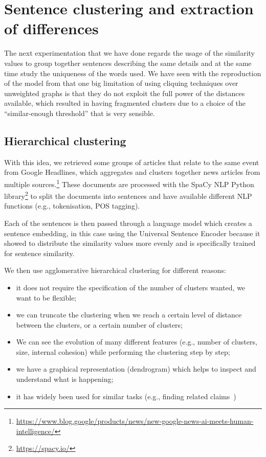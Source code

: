 \section{Sentence clustering and extraction of differences}
\label{sec:cgs_clustering_and_differences}
The next experimentation that we have done regards the usage of the similarity values to group together sentences describing the same details and at the same time study the uniqueness of the words used.
We have seen with the reproduction of the model from \citet{bountouridis2018explaining} that one big limitation of using cliquing techniques over unweighted graphs is that they do not exploit the full power of the distances available, which resulted in having fragmented clusters due to a choice of the ``similar-enough threshold'' that is very sensible.

\subsection{Hierarchical clustering}

With this idea, we retrieved some groups of articles that relate to the same event from Google Headlines, which aggregates and clusters together news articles from multiple sources.\footnote{\url{https://www.blog.google/products/news/new-google-news-ai-meets-human-intelligence/}}
These documents are processed with the SpaCy NLP Python library\footnote{\url{https://spacy.io/}} to split the documents into sentences and have available different NLP functions (e.g., tokenisation, POS tagging).

Each of the sentences is then passed through a language model which creates a sentence embedding, in this case using the Universal Sentence Encoder because it showed to distribute the similarity values more evenly and is specifically trained for sentence similarity.

We then use agglomerative hierarchical clustering for different reasons:
\begin{itemize}
    \item it does not require the specification of the number of clusters wanted, we want to be flexible;
    \item we can truncate the clustering when we reach a certain level of distance between the clusters, or a certain number of clusters;
    \item We can see the evolution of many different features (e.g., number of clusters, size, internal cohesion) while performing the clustering step by step;
    \item we have a graphical representation (dendrogram) which helps to inspect and understand what is happening;
    \item it has widely been used for similar tasks (e.g., finding related claims~\citep{almeida2020text})
\end{itemize}

